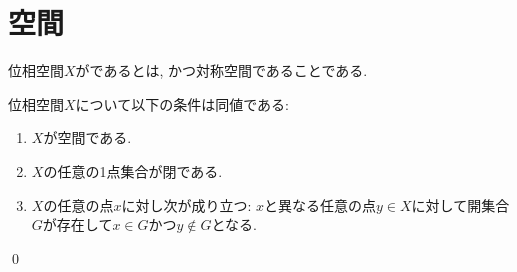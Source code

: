 \documentclass[uplatex, dvipdfmx, a4paper, 12pt, class=jsbook, crop=false]{standalone}
\begin{document}
\section{空間}
\label{sec:T1-spaces}

\begin{definition}
	位相空間$ X $がであるとは, かつ対称空間であることである.
\end{definition}

\begin{proposition}
	位相空間$ X $について以下の条件は同値である:
	\begin{enumerate}
		\item $ X $が空間である.
		\item $ X $の任意の1点集合が閉である.
		\item $ X $の任意の点$ x $に対し次が成り立つ: $ x $と異なる任意の点$ y \in X $に対して開集合$ G $が存在して$ x \in G $かつ$ y \not\in G $となる.
	\end{enumerate}
	\qed
\end{proposition}
\end{document}
